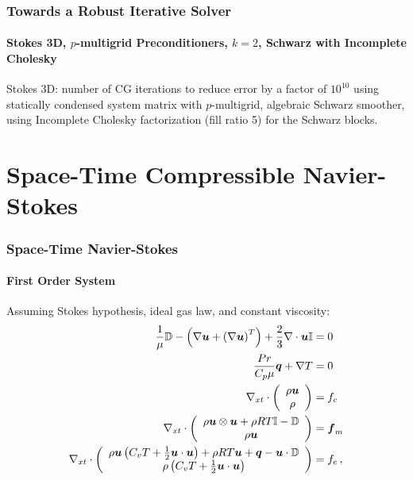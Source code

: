 \documentclass[18pt,xcolor=table]{beamer}
\begin{document}
\begin{frame}
\frametitle{Towards a Robust Iterative Solver}
\framesubtitle{Stokes 3D, $p$-multigrid Preconditioners, $k=2$, Schwarz with Incomplete Cholesky}  %
  \begin{figure}[ht]
  \centering
  \label{fig:Stokes3Dk2GMGIC}
  \end{figure}
  \vspace{-5mm}
  Stokes 3D: number of CG iterations to reduce error by a factor of $10^{10}$ using statically condensed system matrix with $p$-multigrid, algebraic Schwarz smoother, using Incomplete Cholesky factorization (fill ratio 5) for the Schwarz blocks.
\end{frame}


\section{Space-Time Compressible Navier-Stokes}
\begin{frame}[t]
\frametitle{Space-Time Navier-Stokes}
\framesubtitle{First Order System}
Assuming Stokes hypothesis, ideal gas law, and constant viscosity:
\begin{align*}
  \frac{1}{\mu}\mathbb{D}-\left( \nabla\boldsymbol u+\left( \nabla\boldsymbol u \right)^T \right)+\frac{2}{3}\nabla\cdot\boldsymbol u\mathbb{I}&=0\\
  \frac{Pr}{C_p\mu}\boldsymbol q+\nabla T&=0\\
  \nabla_{xt}\cdot\left( \begin{array}{c} \rho\boldsymbol u\\ \rho\\ \end{array} \right)&=f_c\\
  \nabla_{xt}\cdot\left( \begin{array}{c} \rho\boldsymbol u\otimes\boldsymbol u+\rho RT\mathbb{I}-\mathbb{D}\\ \rho\boldsymbol u\\ \end{array} \right)&=\boldsymbol f_m\\
  \nabla_{xt}\cdot\left( \begin{array}{c} \rho\boldsymbol u\left( C_v T+\frac{1}{2}\boldsymbol u\cdot\boldsymbol u \right)+\rho RT\boldsymbol u+\boldsymbol q-\boldsymbol u\cdot\mathbb{D}\\ \rho\left( C_v T+\frac{1}{2}\boldsymbol u\cdot\boldsymbol u \right)\\ \end{array} \right)&=f_e\,,
\end{align*}
\end{frame}
\end{document}
